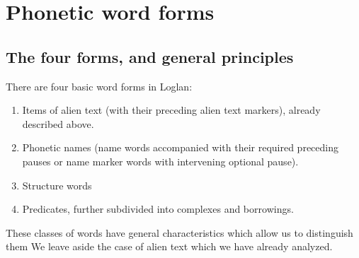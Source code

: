 \documentclass[12pt]{book}
\begin{document}
\section{Phonetic word forms}

\subsection{The four forms, and general principles}

There are four basic word forms in Loglan: 

\begin{enumerate}

\item Items of alien text (with their preceding alien text markers), already described above.

\item Phonetic names (name words accompanied with their required preceding pauses or name marker words with intervening optional pause).

\item  Structure words

\item Predicates, further subdivided into complexes and borrowings.

\end{enumerate}

These classes of words have general characteristics which allow us to distinguish them  We leave aside the case of alien text which we have already analyzed.
\end{document}
